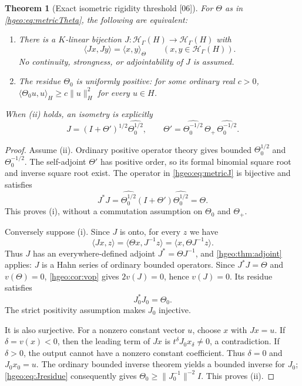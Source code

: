 \documentclass[11pt,letterpaper]{article}
\numberwithin{equation}{section}
\newtheorem{theorem}{Theorem}[section]
\theoremstyle{definition}
\theoremstyle{remark}
\newcommand{\K}{K}
\newcommand{\HH}[1]{\mathscr H_\Gamma(#1)}
\newcommand{\ip}[2]{\langle #1,#2\rangle}
\newcommand{\norm}[1]{\lVert #1\rVert}
\newcommand{\src}[1]{\textup{\textsf{\small[#1]}}}
\begin{document}
\begin{theorem}[Exact isometric rigidity threshold \src{06}]
\label{hgeo:thm:metric}
For $\Theta$ as in \eqref{hgeo:eq:metricTheta}, the following are equivalent:
\begin{enumerate}[label=\textup{(\roman*)}]
\item There is a $\K$-linear bijection $J:\HH{H}\to\HH{H}$ with
\[
 \ip{Jx}{Jy}=\ip{x}{y}_\Theta\qquad(x,y\in\HH{H}).
\]
No continuity, strongness, or adjointability of $J$ is assumed.
\item The residue $\Theta_0$ is uniformly positive: for some ordinary real
$c>0$, $\ip{\Theta_0u}{u}_H\ge c\norm{u}_H^2$ for every $u\in H$.
\end{enumerate}
When (ii) holds, an isometry is explicitly
\begin{equation}\label{hgeo:eq:metricJ}
 J=(I+\Theta')^{1/2}\widehat{\Theta_0^{1/2}},\qquad
 \Theta'=\widehat{\Theta_0^{-1/2}}\,\Theta_+\,\widehat{\Theta_0^{-1/2}}.
\end{equation}
\end{theorem}
\begin{proof}
Assume (ii). Ordinary positive operator theory gives bounded
$\Theta_0^{1/2}$ and $\Theta_0^{-1/2}$. The self-adjoint $\Theta'$ has
positive order, so its formal binomial square root and inverse square root
exist. The operator in \eqref{hgeo:eq:metricJ} is bijective and satisfies
\[
 J^*J=\widehat{\Theta_0^{1/2}}(I+\Theta')\widehat{\Theta_0^{1/2}}=\Theta.
\]
This proves (i), without a commutation assumption on $\Theta_0$ and
$\Theta_+$.

Conversely suppose (i). Since $J$ is onto, for every $z$ we have
\[
 \ip{Jx}{z}=\ip{\Theta x}{J^{-1}z}=\ip{x}{\Theta J^{-1}z}.
\]
Thus $J$ has an everywhere-defined adjoint $J^*=\Theta J^{-1}$, and
\cref{hgeo:thm:adjoint} applies: $J$ is a Hahn series of ordinary bounded
operators. Since $J^*J=\Theta$ and $v(\Theta)=0$, \cref{hgeo:cor:vop} gives
$2v(J)=0$, hence $v(J)=0$. Its residue satisfies
\begin{equation}\label{hgeo:eq:Jresidue}
 J_0^*J_0=\Theta_0.
\end{equation}
The strict positivity assumption makes $J_0$ injective.

It is also surjective. For a nonzero constant vector $u$, choose $x$ with
$Jx=u$. If $\delta=v(x)<0$, then the leading term of $Jx$ is
$t^\delta J_0x_\delta\ne0$, a contradiction. If $\delta>0$, the output
cannot have a nonzero constant coefficient. Thus $\delta=0$ and
$J_0x_0=u$. The ordinary bounded inverse theorem yields a bounded inverse for
$J_0$; \eqref{hgeo:eq:Jresidue} consequently gives
$\Theta_0\ge\norm{J_0^{-1}}^{-2}I$. This proves (ii).
\end{proof}
\end{document}
